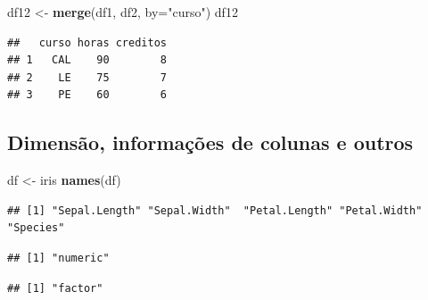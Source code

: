 \documentclass[
]{book}
\newenvironment{Shaded}{\begin{snugshade}}{\end{snugshade}}
\newcommand{\AttributeTok}[1]{\textcolor[rgb]{0.13,0.29,0.53}{#1}}
\newcommand{\FunctionTok}[1]{\textcolor[rgb]{0.13,0.29,0.53}{\textbf{#1}}}
\newcommand{\NormalTok}[1]{#1}
\newcommand{\OtherTok}[1]{\textcolor[rgb]{0.56,0.35,0.01}{#1}}
\newcommand{\SpecialCharTok}[1]{\textcolor[rgb]{0.81,0.36,0.00}{\textbf{#1}}}
\newcommand{\StringTok}[1]{\textcolor[rgb]{0.31,0.60,0.02}{#1}}
\begin{document}
\begin{Shaded}
\begin{Highlighting}[]
\NormalTok{df12 }\OtherTok{\textless{}{-}} \FunctionTok{merge}\NormalTok{(df1, df2, }\AttributeTok{by=}\StringTok{"curso"}\NormalTok{)}
\NormalTok{df12}
\end{Highlighting}
\end{Shaded}

\begin{verbatim}
##   curso horas creditos
## 1   CAL    90        8
## 2    LE    75        7
## 3    PE    60        6
\end{verbatim}

\subsection{Dimensão, informações de colunas e outros}\label{dimensuxe3o-informauxe7uxf5es-de-colunas-e-outros}

\begin{Shaded}
\begin{Highlighting}[]
\NormalTok{df }\OtherTok{\textless{}{-}}\NormalTok{ iris}
\FunctionTok{names}\NormalTok{(df)}
\end{Highlighting}
\end{Shaded}

\begin{verbatim}
## [1] "Sepal.Length" "Sepal.Width"  "Petal.Length" "Petal.Width"  "Species"
\end{verbatim}

\begin{Shaded}
\end{Shaded}

\begin{verbatim}
## [1] "numeric"
\end{verbatim}

\begin{Shaded}
\end{Shaded}

\begin{verbatim}
## [1] "factor"
\end{verbatim}
\end{document}
